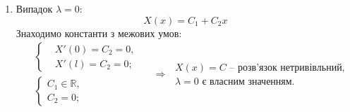 \begin{enumerate}
\begin{enumerate}[wide, labelindent=0pt]
        \item Випадок $\lambda = 0$:
        \begin{equation*}
            X(x) = C_1 + C_2 x
        \end{equation*}
        Знаходимо константи з межових умов:
        \begin{equation*}
            \begin{aligned}
                &\left\{ \begin{aligned}
                    &X'(0) = C_2 = 0, \\ 
                    &X'(l) = C_2 = 0;
                \end{aligned} \right.
                \\   
                &\left\{ \begin{aligned}
                    C_1 \in \mathbb{R}, \\ 
                    C_2 = 0;
                \end{aligned} \right.
            \end{aligned}
            \quad\Rightarrow\;
            \begin{aligned}
                X(x) = C \text{ -- розв'язок нетривівльний,}\\
                \lambda = 0 \text{ є власним значенням.}
            \end{aligned}
        \end{equation*}


\end{enumerate}
\end{enumerate}
